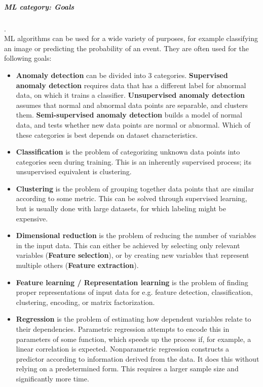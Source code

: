 \subparagraph{ML category: Goals}
.\\
ML algorithms can be used for a wide variety of purposes, for example classifying an image or predicting the probability of an event. They are often used for the following goals:
\begin{itemize}
	\item \textbf{Anomaly detection}
		can be divided into 3 categories. \textbf{Supervised anomaly detection} requires data that has a different label for abnormal data, on which it trains a classifier. \textbf{Unsupervised anomaly detection} assumes that normal and abnormal data points are separable, and clusters them. \textbf{Semi-supervised anomaly detection} builds a model of normal data, and tests whether new data points are normal or abnormal. Which of these categories is best depends on dataset characteristics.
	\item \textbf{Classification}
		is the problem of categorizing unknown data points into categories seen during training. This is an inherently supervised process; its unsupervised equivalent is clustering.
	\item \textbf{Clustering}
		is the problem of grouping together data points that are similar according to some metric. This can be solved through supervised learning, but is usually done with large datasets, for which labeling might be expensive.
	\item \textbf{Dimensional reduction}
		is the problem of reducing the number of variables in the input data. This can either be achieved by selecting only relevant variables (\textbf{Feature selection}), or by creating new variables that represent multiple others (\textbf{Feature extraction}).
	\item \textbf{Feature learning / Representation learning}
		is the problem of finding proper representations of input data for e.g. feature detection, classification, clustering, encoding, or matrix factorization.
	\item \textbf{Regression}
		is the problem of estimating how dependent variables relate to their dependencies. Parametric regression attempts to encode this in parameters of some function, which speeds up the process if, for example, a linear correlation is expected. Nonparametric regression constructs a predictor according to information derived from the data. It does this without relying on a predetermined form. This requires a larger sample size and significantly more time.
\end{itemize}

